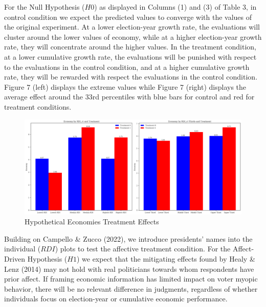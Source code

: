 \documentclass[
]{article}
\begin{document}
\begin{center}
  
\end{center}

For the Null Hypothesis (\(H0\)) as displayed in Columns (1) and (3) of
Table 3, in control condition we expect the predicted values to converge
with the values of the original experiment. At a lower election-year
growth rate, the evaluations will cluster around the lower values of
economy, while at a higher election-year growth rate, they will
concentrate around the higher values. In the treatment condition, at a
lower cumulative growth rate, the evaluations will be punished with
respect to the evaluations in the control condition, and at a higher
cumulative growth rate, they will be rewarded with respect the
evaluations in the control condition. Figure 7 (left) displays the
extreme values while Figure 7 (right) displays the average effect around
the 33rd percentiles with blue bars for control and red for treatment
conditions.

\begin{figure}
\hypertarget{fig:label}{%
\centering
\includegraphics[width=1\textwidth,height=1\textheight]{treat_lowthird.png}
\caption{Hypothetical Economies Treatment Effects}\label{fig:label}
}
\end{figure}

Building on Campello \& Zucco (2022), we introduce presidents' names
into the individual (\(RDI\)) plots to test the affective treatment
condition. For the Affect-Driven Hypothesis (\(H1\)) we expect that the
mitigating effects found by Healy \& Lenz (2014) may not hold with real
politicians towards whom respondents have prior affect. If framing
economic information has limited impact on voter myopic behavior, there
will be no relevant difference in judgments, regardless of whether
individuals focus on election-year or cumulative economic performance.
\end{document}
